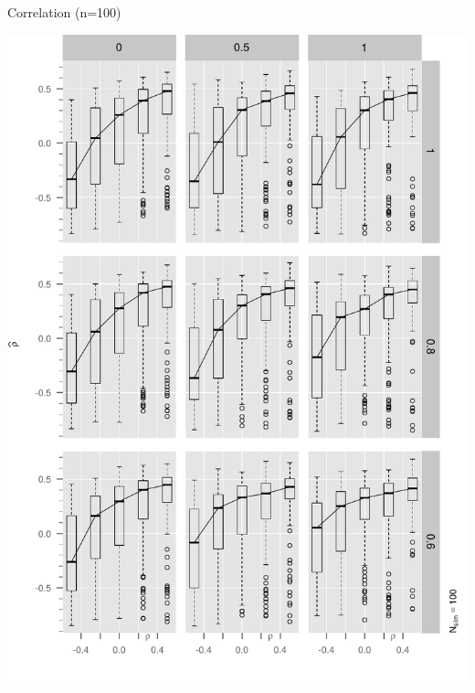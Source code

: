 \begin{frame}{Correlation (n=100)}

\begin{center}
  \includegraphics[trim= 0cm 0cm 0cm 11.75cm, clip, scale=0.475]{Figure1/tbl1_n100_rho_mayplot.pdf}
\end{center}

\end{frame}

